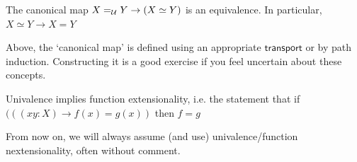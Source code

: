 \documentclass[10pt,oneside,leqno,openright]{memoir}
\begin{document}
\begin{axiom}[Univalence]
  The canonical map $X=_{\mathcal{U}} Y \to (X \simeq Y)$ is an equivalence.
  In particular, $X \simeq Y \to X = Y$
\end{axiom}
Above, the `canonical map' is defined using an appropriate
$\mathsf{transport}$ or by path induction.
%
Constructing it is a good exercise if you feel uncertain about these
concepts.

\begin{fact}
  Univalence implies function extensionality, i.e. the statement that if $(((x y : X) \to f(x) = g(x))$ then $f = g$
\end{fact}
From now on, we will always assume (and use) univalence/function nextensionality, often without comment.





\end{document}
